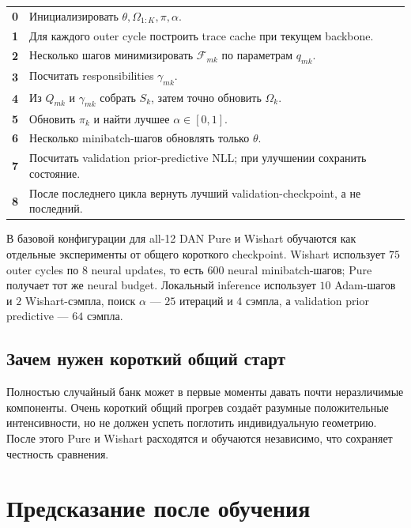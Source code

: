 \documentclass[12pt,a4paper]{article}
\begin{document}
\medskip
{}
\begin{center}
\begin{tabularx}{\textwidth}{@{}>{\bfseries}p{8mm}X@{}}
0 & Инициализировать \(\theta,\Omega_{1:K},\pi,\alpha\).\\
1 & Для каждого outer cycle построить trace cache при текущем backbone.\\
2 & Несколько шагов минимизировать \(\mathcal F_{mk}\) по параметрам \(q_{mk}\).\\
3 & Посчитать responsibilities \(\gamma_{mk}\).\\
4 & Из \(Q_{mk}\) и \(\gamma_{mk}\) собрать \(S_k\), затем точно обновить \(\Omega_k\).\\
5 & Обновить \(\pi_k\) и найти лучшее \(\alpha\in[0,1]\).\\
6 & Несколько minibatch-шагов обновлять только \(\theta\).\\
7 & Посчитать validation prior-predictive NLL; при улучшении сохранить состояние.\\
8 & После последнего цикла вернуть лучший validation-checkpoint, а не последний.\\
\end{tabularx}
\end{center}

В базовой конфигурации для all-12 DAN Pure и Wishart обучаются как отдельные эксперименты от общего короткого checkpoint. Wishart использует \(75\) outer cycles по \(8\) neural updates, то есть \(600\) neural minibatch-шагов; Pure получает тот же neural budget. Локальный inference использует \(10\) Adam-шагов и \(2\) Wishart-сэмпла, поиск \(\alpha\) --- \(25\) итераций и \(4\) сэмпла, а validation prior predictive --- \(64\) сэмпла.

\subsection{Зачем нужен короткий общий старт}

Полностью случайный банк может в первые моменты давать почти неразличимые компоненты. Очень короткий общий прогрев создаёт разумные положительные интенсивности, но не должен успеть поглотить индивидуальную геометрию. После этого Pure и Wishart расходятся и обучаются независимо, что сохраняет честность сравнения.

\section{Предсказание после обучения}
\end{document}
